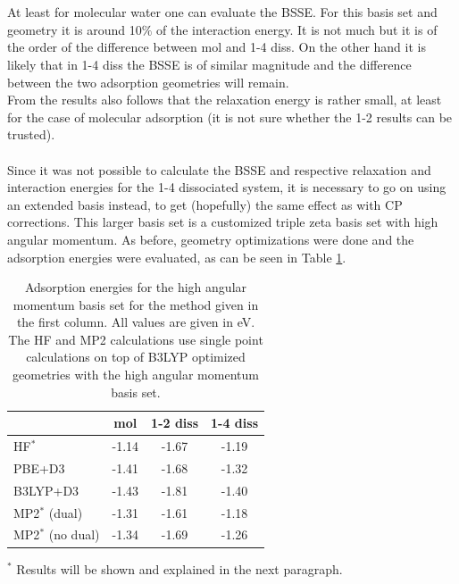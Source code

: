 \documentclass[11pt,DIV=13,BCOR=5mm,a4paper,headinclude]{scrbook}
\begin{document}
\\
\\
At least for molecular water one can evaluate the BSSE.
For this basis set and geometry it is around 10$\%$ of the interaction
energy.
It is not much but it is of the order of the difference between mol and 1-4 diss.
On the other hand it is likely that in 1-4 diss the BSSE is of similar magnitude and the difference between the two adsorption geometries will remain.
\\
From the results also follows that the relaxation energy is rather small, at least for the case of molecular adsorption (it is not sure whether the 1-2 results can be trusted).
\\\\
Since it was not possible to calculate the BSSE and respective relaxation and interaction energies for the 1-4 dissociated system, it is necessary to go on using an extended basis instead, to get (hopefully) the same effect as with CP corrections.
This larger basis set is a customized triple zeta basis set with high angular momentum.
As before, geometry optimizations were done and the adsorption energies were evaluated, as can be seen in Table \ref{tab:combined_results}.
\begin{table}[!h]
  \centering
   \caption{Adsorption energies for the high angular momentum basis set for the method given in the first column.
All values are given in eV. The HF and MP2 calculations use single point calculations on top of B3LYP optimized geometries with the high angular momentum basis set.}
  \begin{tabular}{l|ccc}
  \toprule
   &mol & 1-2 diss & 1-4 diss \\\midrule
HF$^\ast$ &-1.14 & -1.67 & -1.19\\
PBE+D3 & -1.41 & -1.68 & -1.32 \\
B3LYP+D3 & -1.43 & -1.81 & -1.40 \\
MP2$^\ast$ (dual) & -1.31 & -1.61 & -1.18 \\ %
MP2$^\ast$ (no dual) & -1.34 & -1.69 & -1.26\\\bottomrule
  \end{tabular}
  \begin{tablenotes}
 \footnotesize
\item[] $^\ast$ Results will be shown and explained in the next paragraph.
  \end{tablenotes}
  \label{tab:combined_results}
\end{table}
\\
\end{document}
